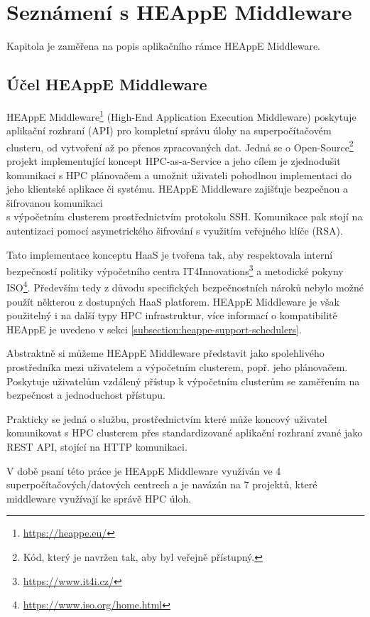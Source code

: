 \chapter{Seznámení s HEAppE Middleware}\label{chapter:chapter-about-heappe-middleware}
Kapitola je zaměřena na popis aplikačního rámce HEAppE Middleware.

\section{Účel HEAppE Middleware}
HEAppE Middleware\footnote{\href{https://heappe.eu/}{https://heappe.eu/}} (High-End Application Execution Middleware) poskytuje aplikační rozhraní (API) pro kompletní správu úlohy na superpočítačovém clusteru, od vytvoření až po přenos zpracovaných dat. Jedná se o Open-Source\footnote{Kód, který je navržen tak, aby byl veřejně přístupný.} projekt implementující koncept HPC-as-a-Service a jeho cílem je zjednodušit komunikaci s HPC plánovačem a umožnit uživateli pohodlnou implementaci do jeho klientské aplikace či systému. HEAppE Middleware zajišťuje bezpečnou a šifrovanou komunikaci \\s výpočetním clusterem prostřednictvím protokolu SSH. Komunikace pak stojí na autentizaci pomocí asymetrického šifrování s využitím veřejného klíče (RSA).

Tato implementace konceptu HaaS je tvořena tak, aby respektovala interní bezpečností politiky výpočetního centra IT4Innovations\footnote{\href{https://www.it4i.cz/}{https://www.it4i.cz/}} a metodické pokyny ISO\footnote{\href{https://www.iso.org/home.html}{https://www.iso.org/home.html}}. Především tedy z důvodu specifických bezpečnostních nároků nebylo možné použít některou z dostupných HaaS platforem. HEAppE Middleware je však použitelný i na další typy HPC infrastruktur, více informací o kompatibilitě HEAppE je uvedeno v sekci \ref{subsection:heappe-support-schedulers}.


Abstraktně si můžeme HEAppE Middleware představit jako spolehlivého prostředníka mezi uživatelem a výpočetním clusterem, popř. jeho plánovačem. Poskytuje uživatelům vzdálený přístup k výpočetním clusterům se zaměřením na bezpečnost a jednoduchost přístupu.

Prakticky se jedná o službu, prostřednictvím které může koncový uživatel komunikovat s HPC clusterem přes standardizované aplikační rozhraní zvané jako REST API, stojící na HTTP komunikaci.

V době psaní této práce je HEAppE Middleware využíván ve 4 superpočítačových/datových centrech a je navázán na 7 projektů, které middleware využívají ke správě HPC úloh.


